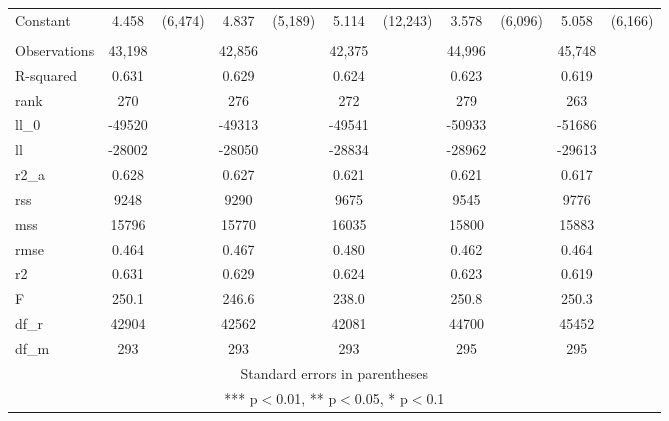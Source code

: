 \documentclass[]{article}
\begin{document}
\begin{tabular}{lcccccccccc}
Constant & 4.458 & (6,474) & 4.837 & (5,189) & 5.114 & (12,243) & 3.578 & (6,096) & 5.058 & (6,166) \\
 &  &  &  &  &  &  &  &  &  &  \\
Observations & 43,198 &  & 42,856 &  & 42,375 &  & 44,996 &  & 45,748 &  \\
R-squared & 0.631 &  & 0.629 &  & 0.624 &  & 0.623 &  & 0.619 &  \\
rank & 270 &  & 276 &  & 272 &  & 279 &  & 263 &  \\
ll\_0 & -49520 &  & -49313 &  & -49541 &  & -50933 &  & -51686 &  \\
ll & -28002 &  & -28050 &  & -28834 &  & -28962 &  & -29613 &  \\
r2\_a & 0.628 &  & 0.627 &  & 0.621 &  & 0.621 &  & 0.617 &  \\
rss & 9248 &  & 9290 &  & 9675 &  & 9545 &  & 9776 &  \\
mss & 15796 &  & 15770 &  & 16035 &  & 15800 &  & 15883 &  \\
rmse & 0.464 &  & 0.467 &  & 0.480 &  & 0.462 &  & 0.464 &  \\
r2 & 0.631 &  & 0.629 &  & 0.624 &  & 0.623 &  & 0.619 &  \\
F & 250.1 &  & 246.6 &  & 238.0 &  & 250.8 &  & 250.3 &  \\
df\_r & 42904 &  & 42562 &  & 42081 &  & 44700 &  & 45452 &  \\
 df\_m & 293 &  & 293 &  & 293 &  & 295 &  & 295 &  \\ \hline
\multicolumn{11}{c}{ Standard errors in parentheses} \\
\multicolumn{11}{c}{ *** p$<$0.01, ** p$<$0.05, * p$<$0.1} \\
\end{tabular}
\end{document}
